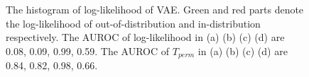 \documentclass[letterpaper]{article} %
\begin{document}
\begin{figure}[t]
\centering
{}
\quad
{}
\caption{The histogram of log-likelihood of VAE. 
Green and red parts denote the log-likelihood of out-of-distribution and in-distribution respectively. 
The AUROC of log-likelihood in (a) (b) (c) (d) are 0.08, 0.09, 0.99, 0.59. The AUROC of $T_{perm}$ in (a) (b) (c) (d) are 0.84, 0.82, 0.98, 0.66. }
\label{fig1}
\end{figure}
\end{document}
